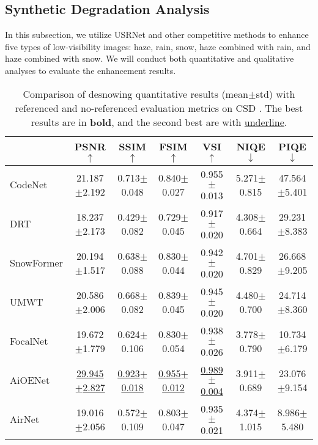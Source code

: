 \documentclass[final,12pt]{elsarticle}
\begin{document}
\subsection{Synthetic Degradation Analysis}
   In this subsection, we utilize USRNet and other competitive methods to enhance five types of low-visibility images: haze, rain, snow, haze combined with rain, and haze combined with snow. We will conduct both quantitative and qualitative analyses to evaluate the enhancement results.
    \setlength{\tabcolsep}{0.50pt}
    \begin{table}[t]
        \centering
        \scriptsize
        \caption{Comparison of desnowing quantitative results (mean$\pm$std) with referenced and no-referenced evaluation metrics on CSD \citep {chen2021all}. The best results are in \textbf{bold}, and the second best are with \underline{underline}.}
        \begin{tabular}{l|cccc|cc}
        \hline
        & PSNR $\uparrow$ & SSIM $\uparrow$ & FSIM $\uparrow$ & VSI $\uparrow$ & NIQE $\downarrow$ & PIQE $\downarrow$\\ \hline\hline
        CodeNet \citep{yu2021single}      & 21.187$\pm$2.192 & 0.713$\pm$0.048 & 0.840$\pm$0.027 & 0.955$\pm$0.013 & 5.271$\pm$0.815 & 47.564$\pm$5.401 \\ 
        DRT \citep{liang2022drt}          & 18.237$\pm$2.173 & 0.429$\pm$0.082 & 0.729$\pm$0.045 & 0.917$\pm$0.020 & 4.308$\pm$0.664 & 29.231$\pm$8.383 \\ 
        SnowFormer \citep{chen2022snowformer}   & 20.194$\pm$1.517 & 0.638$\pm$0.088 & 0.830$\pm$0.044 & 0.942$\pm$0.020 & 4.701$\pm$0.829 & 26.668$\pm$9.205 \\ 
        UMWT \citep{kulkarni2023unified}         & 20.586$\pm$2.006 & 0.668$\pm$0.082 & 0.839$\pm$0.045 & 0.945$\pm$0.020 & 4.480$\pm$0.700 & 24.714$\pm$8.360 \\ 
        FocalNet \citep{cui2023focal}     & 19.672$\pm$1.779 & 0.624$\pm$0.106 & 0.830$\pm$0.054 & 0.938$\pm$0.026 & 3.778$\pm$0.790 & 10.734$\pm$6.179 \\ 
        AiOENet \citep{liu2023aioenet}      & \underline{29.945$\pm$2.827} & \underline{0.923$\pm$0.018} & \underline{0.955$\pm$0.012} & \underline{0.989$\pm$0.004} & 3.911$\pm$0.689 & 23.076$\pm$9.154 \\ 
        AirNet \citep{li2022all}              &     19.016$\pm$2.056  & 	0.572$\pm$0.109  & 	0.803$\pm$0.047  & 	0.935$\pm$0.021 & 	4.374$\pm$1.015 & 	8.986$\pm$5.480   \\ 

\end{tabular}
\end{table}
\end{document}
